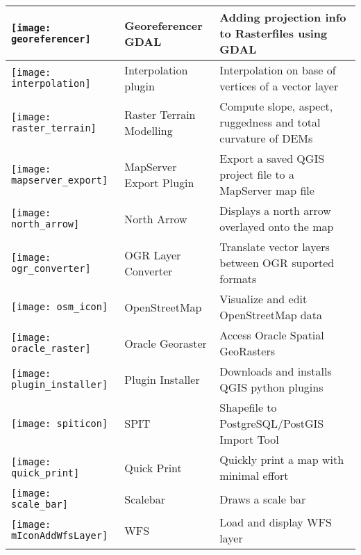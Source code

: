 {\begin{longtable}{|p{1.2cm}|p{3.8cm}|p{10.5cm}|}
\hline
\texttt{[image: georeferencer]}
 & Georeferencer GDAL \index{plugin!georeferencer} & Adding projection info to Rasterfiles using GDAL\\
\hline
\texttt{[image: interpolation]}
& Interpolation plugin \index{plugins!Interpolation}& Interpolation on base of vertices of a vector layer\\
\hline
\texttt{[image: raster\_terrain]}
& Raster Terrain Modelling \index{plugins!Raster Terrain Modelling}& Compute slope, aspect,
ruggedness and total curvature of DEMs\\
\hline
\texttt{[image: mapserver\_export]}
& MapServer Export Plugin \index{plugins!MapServer Export}& Export a saved QGIS project file to a MapServer map file \\
\hline
\texttt{[image: north\_arrow]}
& North Arrow \index{plugins!north arrow}& Displays a north arrow overlayed onto the map\\
\hline
\texttt{[image: ogr\_converter]}
 & OGR Layer Converter \index{plugins!OGR converter} & Translate vector
layers between OGR suported formats\\
\hline
\texttt{[image: osm\_icon]}
 & OpenStreetMap & Visualize and edit OpenStreetMap data \\
\hline
\texttt{[image: oracle\_raster]}
 & Oracle Georaster \index{plugins!georaster}& Access Oracle Spatial GeoRasters\\
\hline
\texttt{[image: plugin\_installer]}
 & Plugin Installer \index{plugins!Plugin Installer} & Downloads and installs QGIS python plugins\\
\hline
\texttt{[image: spiticon]}
 & SPIT \index{plugins!spit}& Shapefile to PostgreSQL/PostGIS Import Tool \\
\hline
\texttt{[image: quick\_print]}
 & Quick Print \index{plugins!quick print}& Quickly print a map with minimal
effort \\
\hline
\texttt{[image: scale\_bar]}
 & Scalebar \index{plugins!scalebar}& Draws a scale bar\\
\hline
\texttt{[image: mIconAddWfsLayer]}
 & WFS & Load and display WFS layer \\
\hline
\end{longtable}}

